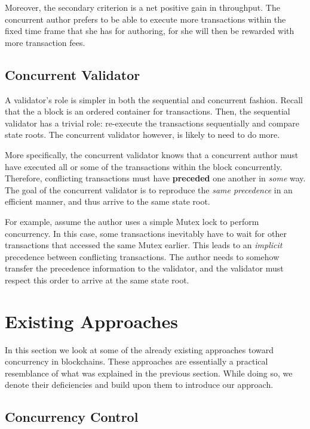 Moreover, the secondary criterion is a net positive gain in throughput. The concurrent author
prefers to be able to execute more transactions within the fixed time frame that she has for
authoring, for she will then be rewarded with more transaction fees.

\subsection{Concurrent Validator}

A validator's role is simpler in both the sequential and concurrent fashion. Recall that the a block
is an ordered container for transactions. Then, the sequential validator has a trivial role:
re-execute the transactions sequentially and compare state roots. The concurrent validator however,
is likely to need to do more.

More specifically, the concurrent validator knows that a concurrent author must have executed all or
some of the transactions within the block concurrently. Therefore, conflicting transactions must
have \textbf{preceded} one another in \textit{some} way. The goal of the concurrent validator is to
reproduce the \textit{same precedence} in an efficient manner, and thus arrive to the same state
root.

For example, assume the author uses a simple Mutex lock to perform concurrency. In this case, some
transactions inevitably have to wait for other transactions that accessed the same Mutex
earlier. This leads to an \textit{implicit} precedence between conflicting transactions. The author
needs to somehow transfer the precedence information to the validator, and the validator must
respect this order to arrive at the same state root.

\section{Existing Approaches}\label{chap_approach:existing}

In this section we look at some of the already existing approaches toward concurrency in
blockchains. These approaches are essentially a practical resemblance of what was explained in the
previous section. While doing so, we denote their deficiencies and build upon them to introduce our
approach.

\subsection{Concurrency Control}

